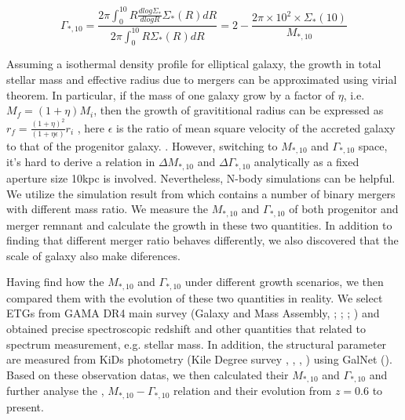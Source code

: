 \documentclass[fleqn,usenatbib]{mnras}
\begin{document}
\begin{equation}
    \Gamma_{*,10} = \frac{2\pi \int_0^{10} R \frac{dlog\Sigma_*}{dlogR}\Sigma_*(R)dR}{2\pi \int_0^{10}R\Sigma_*(R)dR} = 2 - \frac{2\pi \times 10^2 \times \Sigma_*(10)}{M_{*,10}}
\end{equation} 
\par Assuming a isothermal density profile for elliptical galaxy, the growth in total stellar mass and effective radius due to mergers can be approximated using virial theorem\citep{naab_minor_2009}. In particular, if the mass of one galaxy grow by a factor of $\eta$, i.e. $M_f = (1+\eta) M_i$, then the growth of gravititional radius can be expressed as $r_f = \frac{(1+\eta)^2}{(1+\eta \epsilon)} r_i$ , here $\epsilon$ is the ratio of mean square velocity of the accreted galaxy to that of the progenitor galaxy.
 . However, switching to $M_{*,10}$ and $\Gamma_{*,10}$ space, it's hard to derive a relation in $\Delta M_{*,10}$ and $\Delta \Gamma_{*,10}$ analytically as a fixed aperture size 10kpc is involved. Nevertheless, N-body simulations can be helpful. We utilize the simulation result from \cite{nipoti2009} which contains a number of binary mergers with different mass ratio. We measure the $M_{*,10}$ and $\Gamma_{*,10}$ of both progenitor and merger remnant and calculate the growth in these two quantities. In addition to finding that different merger ratio behaves differently, we also discovered that the scale of galaxy also make diferences. 
\par Having find how the $M_{*,10}$ and $\Gamma_{*,10}$ under different growth scenarios, we then compared them with the evolution of these two quantities in reality. We select ETGs from GAMA DR4 main survey (Galaxy and Mass Assembly, \cite{GAMAmain};\cite{bellstedt_galaxy_2020} ; \cite{GAMA1}; \cite{GAMA2}) and obtained precise spectroscopic redshift and other quantities that related to spectrum measurement, e.g. stellar mass. In addition, 
the structural parameter are measured from KiDs photometry (Kile Degree survey , \cite{kuijken_fourth_2019}, \cite{KiDs_Roy}, \cite{Amaro_rejection_2021}) using GalNet (\cite{GaLNet2022}). Based on these observation datas,  we then calculated their $M_{*,10} $ and $\Gamma_{*,10}$ and further analyse the , $M_{*,10} - \Gamma_{*,10}$ relation and their evolution from $z = 0.6$ to present. 
\end{document}
